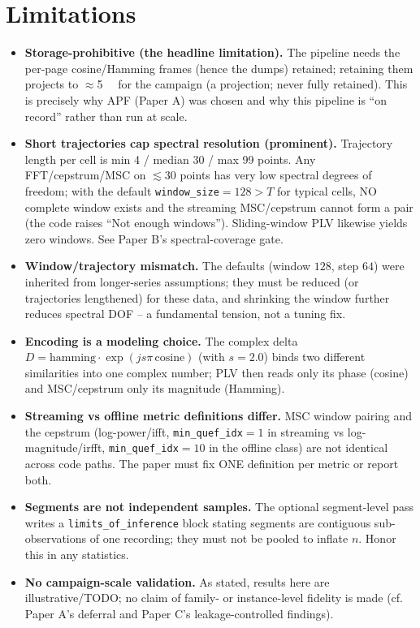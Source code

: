 \documentclass[conference]{IEEEtran}
\begin{document}
\section{Limitations}
\begin{itemize}
  \item \textbf{Storage-prohibitive (the headline limitation).} The pipeline
        needs the per-page cosine/Hamming frames (hence the dumps) retained;
        retaining them projects to $\approx$\SI{5}{\tebi\byte} for the campaign
        (a projection; never fully retained). This is precisely why APF
        (Paper A) was chosen and why this pipeline is ``on record'' rather than
        run at scale.
  \item \textbf{Short trajectories cap spectral resolution (prominent).}
        Trajectory length per cell is min \num{4} / median \num{30} / max
        \num{99} points. Any FFT/cepstrum/MSC on $\lesssim 30$ points has very
        low spectral degrees of freedom; with the default
        \texttt{window\_size}$=128 > T$ for typical cells, NO complete window
        exists and the streaming MSC/cepstrum cannot form a pair (the code
        raises ``Not enough windows''). Sliding-window PLV likewise yields zero
        windows. See Paper B's spectral-coverage gate.
  \item \textbf{Window/trajectory mismatch.} The defaults (window $128$, step
        $64$) were inherited from longer-series assumptions; they must be
        reduced (or trajectories lengthened) for these data, and shrinking the
        window further reduces spectral DOF -- a fundamental tension, not a
        tuning fix.
  \item \textbf{Encoding is a modeling choice.} The complex delta
        $D=\mathrm{hamming}\cdot\exp(j s\pi\,\mathrm{cosine})$ (with $s=2.0$)
        binds two different similarities into one complex number; PLV then reads
        only its phase (cosine) and MSC/cepstrum only its magnitude (Hamming).
  \item \textbf{Streaming vs offline metric definitions differ.} MSC window
        pairing and the cepstrum (log-power/ifft, \texttt{min\_quef\_idx}$=1$ in
        streaming vs log-magnitude/irfft, \texttt{min\_quef\_idx}$=10$ in the
        offline class) are not identical across code paths. The paper must fix
        ONE definition per metric or report both.
  \item \textbf{Segments are not independent samples.} The optional
        segment-level pass writes a \texttt{limits\_of\_inference} block stating
        segments are contiguous sub-observations of one recording; they must not
        be pooled to inflate $n$. Honor this in any statistics.
  \item \textbf{No campaign-scale validation.} As stated, results here are
        illustrative/TODO; no claim of family- or instance-level fidelity is
        made (cf. Paper A's deferral and Paper C's leakage-controlled findings).
\end{itemize}
\end{document}
